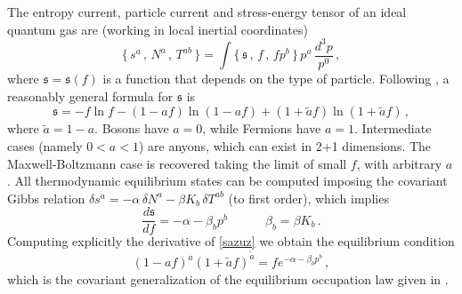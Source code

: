 \documentclass[a4paper, amsfonts, amssymb, amsmath, reprint, showkeys, nofootinbib, twoside, onecolumn,notitlepage]{revtex4-1}
\newcommand{\spc}{\quad \quad \quad}
\begin{document}
The entropy current, particle current and stress-energy tensor of an ideal quantum gas are (working in local inertial coordinates)
\begin{equation}
    \{ \, s^a \, , \, N^a \, , \, T^{ab} \, \} = \int \{ \, \mathfrak{s} \, , \, f \, , \, f p^b \, \} \, p^a \, \dfrac{ d^3 p}{p^0} \, ,  
\end{equation}
where $\mathfrak{s} = \mathfrak{s} (f)$ is a function that depends on the type of particle. Following \citet{WuAnyons1994}, a reasonably general formula for $\mathfrak{s}$ is
\begin{equation}\label{sazuz}
\mathfrak{s}= - f \ln f - (1-af)\ln(1-af) + (1+\tilde{a}f)\ln(1+\tilde{a}f) \, ,
\end{equation}
where $\tilde{a}=1-a$. Bosons have $a=0$, while Fermions have $a=1$. Intermediate cases (namely $0 < a < 1$) are anyons, which can exist in 2+1 dimensions. The Maxwell-Boltzmann case is recovered taking the limit of small $f$, with arbitrary $a$. All thermodynamic equilibrium states can be computed imposing the covariant Gibbs relation $\delta s^a = -\alpha \, \delta N^a - \beta K_b \, \delta T^{ab}$ (to first order), which implies
\begin{equation}
    \dfrac{d \mathfrak{s}}{df} = -\alpha -\beta_b p^b   \spc \beta_b = \beta K_b \, .
\end{equation}
Computing explicitly the derivative of \eqref{sazuz} we obtain the equilibrium condition
\begin{equation}
(1-af)^a (1+\tilde{a} f)^{\tilde{a}} = f e^{-\alpha - \beta_b p^b} \, ,
\end{equation}
which is the covariant generalization of the equilibrium occupation law given in \cite{WuAnyons1994}. 
\end{document}
